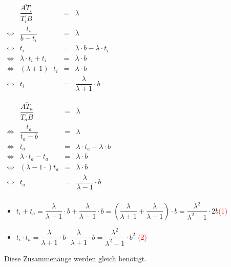 \begin{\small}
\begin{Beweis}
\begin{enumerate}
    \begin{minipage}[t]{0.5\textwidth}
      $\begin{array}{rccl}
        & \dfrac{\overline{AT_{i}}}{\overline{T_{i}B}} & = & \lambda \\
         \Leftrightarrow & \dfrac{t_{i}}{b-t_{i}} & = & \lambda \\
         \Leftrightarrow & t_{i} & = & \lambda \cdot b - \lambda \cdot t_{i} \\
         \Leftrightarrow & \lambda \cdot t_{i} + t_{i} & = & \lambda \cdot b \\
         \Leftrightarrow & (\lambda + 1)\cdot t_{i} & = & \lambda \cdot b \\
         \Leftrightarrow & t_{i} & = & \dfrac {\lambda}{\lambda +1}\cdot b 
      \end{array}$
      \end{minipage}
      \begin{minipage}[t]{0.5\textwidth}
      $\begin{array}{rccl}
        & \dfrac{\overline{AT_{a}}}{\overline{T_{a}B}} & = & \lambda \\
        \Leftrightarrow & \dfrac{t_{a}}{t_{a}-b} & = & \lambda \\
        \Leftrightarrow & t_{a} & = & \lambda \cdot t_{a} - \lambda \cdot b \\
        \Leftrightarrow & \lambda \cdot t_{a} - t_{a} & = & \lambda \cdot b \\
        \Leftrightarrow & (\lambda -1 \cdot )t_{a} & = & \lambda \cdot b \\
        \Leftrightarrow & t_{a} & = & \dfrac{\lambda}{\lambda -1}\cdot b \\
      \end{array}$
    \end{minipage}

    \begin{itemize}
      \item
      $t_{i} + t_{a} = \dfrac {\lambda}{\lambda +1}\cdot b + \dfrac {\lambda}{\lambda -1}\cdot b  =(\dfrac{\lambda}{\lambda+1} + \dfrac{\lambda}{\lambda-1})\cdot b=\dfrac{\lambda^2}{\lambda^2 -1}\cdot 2b $\qquad \textcolor{red}{(1)}
      \item
      $t_{i} \cdot t_{a} =\dfrac {\lambda}{\lambda +1}\cdot b \cdot \dfrac {\lambda}{\lambda +1}\cdot b =\dfrac{\lambda^2}{\lambda^2 -1}\cdot b^2$ \qquad \textcolor{red}{(2)}
    \end{itemize}

    Diese Zusammenänge werden gleich benötigt.



\end{enumerate}
\end{Beweis}
\end{\small}
